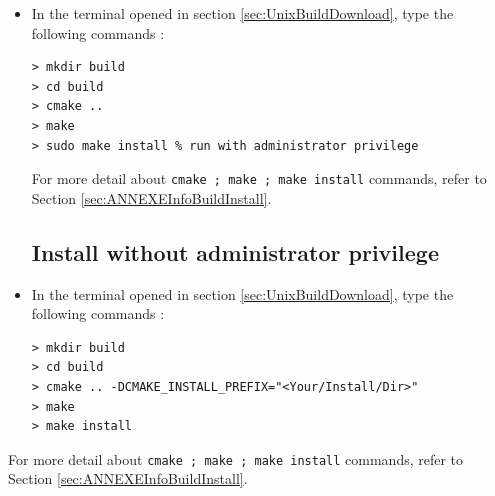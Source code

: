 \begin{itemize}
\section{Basic Build \& Installation using Makefile}\label{sec:UnixBuildInstall}
\paragraph{} 
When you have done the step in section  \ref{sec:UnixBuildDownload} (i.e download Faust package and launch the terminal in the right directory),  the FA$\mu$ST installation can start.
If you are administrator of your machine (root access), follow instructions given in Section \ref{sec:UnixBuildInstallAdmin}. Otherwise, for local installation, refer to Section \ref{sec:UnixBuildInstallNOAdmin}. 

\subsection{Install with administrator privilege}\label{sec:UnixBuildInstallAdmin}
\item In the terminal opened in section 
\ref{sec:UnixBuildDownload}, type the following commands : 
\begin{itemize}
\begin{lstlisting}
> mkdir build
> cd build
> cmake ..
> make
> sudo make install % run with administrator privilege
\end{lstlisting}
\end{itemize}

For more detail about \texttt{cmake ; make ; make install} commands, refer to Section \ref{sec:ANNEXEInfoBuildInstall}.


\subsection{Install without administrator privilege}\label{sec:UnixBuildInstallNOAdmin}
\item In the terminal opened in section 
\ref{sec:UnixBuildDownload}, type the following commands :
\begin{lstlisting}
> mkdir build
> cd build
> cmake .. -DCMAKE_INSTALL_PREFIX="<Your/Install/Dir>"
> make
> make install
\end{lstlisting}
\end{itemize}

For more detail about \texttt{cmake ; make ; make install} commands, refer to Section \ref{sec:ANNEXEInfoBuildInstall}.




